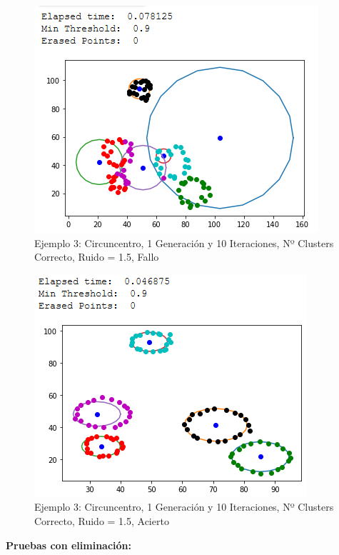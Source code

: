 \documentclass[conference,a4paper]{IEEEtran}
\begin{document}
\begin{figure}[H]
\centering
\includegraphics[scale=0.65]{Experimentacion/Ejemplo3/ej3_c_1_10_mr}
\caption{Ejemplo 3: Circuncentro, 1 Generación y 10 Iteraciones,  Nº Clusters Correcto, Ruido = 1.5, Fallo\\}
\end{figure}

\begin{figure}[H]
\centering
\includegraphics[scale=0.65]{Experimentacion/Ejemplo3/ej3_c_1_10_lr}
\caption{Ejemplo 3: Circuncentro, 1 Generación y 10 Iteraciones,  Nº Clusters Correcto, Ruido = 1.5, Acierto\\}
\end{figure}

\newpage
\textbf{Pruebas con eliminación:}\\
\end{document}
